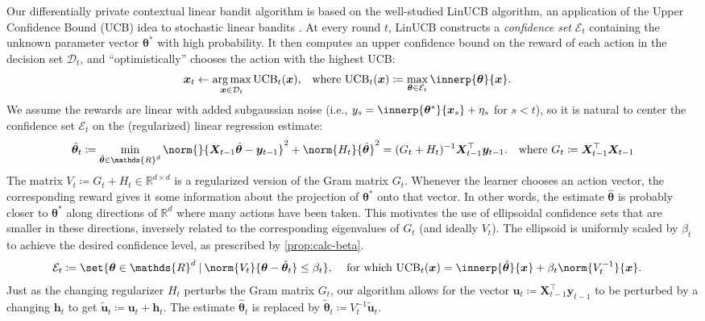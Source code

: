 \documentclass{article}
\renewcommand{\vec}[1]{\bm{#1}}
\newcommand{\defeq}{\coloneq}
\newcommand{\inv}[1]{#1^{-1}}
\newcommand{\Real}{\mathds{R}}
\newcommand{\UCB}{\mathrm{UCB}}
\newcommand{\argmax}{\operatorname*{arg\,max}}
\newcommand\given[1][\delimsize]{%
  \providecommand{\delimsize}{}
  \nonscript\:#1\vert\allowbreak\nonscript\:\mathopen{}
}
\newcommand{\E}{\mathcal{E}}
\providecommand\transp{\top}
\let\transpsymbol\transp
\renewcommand{\transp}[1]{#1^\transpsymbol}
\newcommand{\Dset}[1]{\mathcal{D}_{#1}}
\newcommand{\XtX}[1]{\transp{#1}{#1}}
\begin{document}
Our differentially private contextual linear bandit algorithm is based
on the well-studied LinUCB algorithm, an application of the Upper
Confidence Bound (UCB) idea to stochastic linear bandits
\citep{DaniStochasticLinearOptimization2008,RusmevichientongLinearlyParameterizedBandits2010,AbbasiYadkoriImprovedAlgorithmsLinear2011}.
At every round $t$, LinUCB constructs a \emph{confidence set} $\E_t$
containing the unknown parameter vector $\vec\theta^*$ with high
probability.  It then computes an upper confidence bound on the reward
of each action in the decision set $\Dset{t}$, and ``optimistically''
chooses the action with the highest UCB:
\begin{align}\label{eq:def-ucb}
  \vec x_t &\gets \argmax_{\vec x\in\Dset{t}} \UCB_t(\vec x),
  &\text{where }
  \UCB_t(\vec x) &\defeq \max_{\vec\theta\in\E_t} \innerp{\vec\theta}{\vec x}.
\end{align}
We assume the rewards are linear with added subgaussian noise (i.e.,
$y_s = \innerp{\vec\theta^*}{\vec x_s} + \eta_s$ for $s<t$), so it is
natural to center the confidence set $\E_t$ on the (regularized)
linear regression estimate:
\begin{align*}
  \hat{\vec\theta}_t
  &\defeq \min_{\hat{\vec\theta} \in \Real^d} \norm{}{\vec X_{t-1} \hat{\vec\theta}
    - \vec y_{t-1}}^2 + \norm{H_t}{\hat{\vec\theta}}^2
    = \inv{(G_t + H_t)} \transp{\vec X_{t-1}} \vec y_{t-1}.
    &\text{where } G_t \defeq \XtX{\vec X_{t-1}}
\end{align*}
The matrix $V_t \defeq G_t + H_t \in \Real^{d\times d}$ is a regularized
version of the Gram matrix $G_t$.  Whenever the learner chooses an
action vector, the corresponding reward gives it some information
about the projection of $\vec\theta^*$ onto that vector.  In other
words, the estimate $\hat{\vec\theta}$ is probably closer to
$\vec\theta^*$ along directions of $\Real^d$ where many actions have
been taken.  This motivates the use of ellipsoidal confidence sets
that are smaller in these directions, inversely related to the
corresponding eigenvalues of $G_t$ (and ideally $V_t$). The ellipsoid
is uniformly scaled by $\beta_t$ to achieve the desired confidence
level, as prescribed by \cref{prop:calc-beta}.
\begin{align}\label{eq:def-ellip}
  \E_t &\defeq \set{\vec\theta\in\Real^d \given
        \norm{V_t}{\vec\theta-\hat{\vec\theta}_t} \le \beta_t},
  &\text{ for which }
    \UCB_t(\vec x) &= \innerp{\hat{\vec\theta}}{\vec x} + \beta_t\norm{\inv{V_t}}{\vec x}.
\end{align}
Just as the changing regularizer $H_t$ perturbs the Gram matrix $G_t$,
our algorithm allows for the vector
$\vec u_t \defeq \transp{\vec X_{t-1}} \vec y_{t-1}$ to be perturbed
by a changing $\vec h_t$ to get
$\tilde{\vec u}_t \defeq \vec u_t + \vec h_t$.  The estimate
$\hat{\vec\theta}_t$ is replaced by
$\tilde{\vec\theta}_t \defeq \inv{V_t}\tilde{\vec u}_t$.
\end{document}

